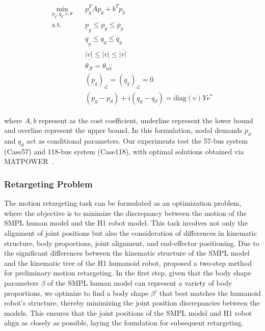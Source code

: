 \begin{align}  
\begin{aligned}
\min_{p_g, q_g, v, \theta} \quad & p_g^TAp_g + b^Tp_g\\  
\text{s.t.}  
\quad & \underline{p}_g \leq p_g \leq \overline{p}_g\\  
\quad & \underline{q}_g \leq q_g \leq \overline{q}_g\\  
\quad & \underline{|v|} \leq |v| \leq \overline{|v|}\\  
\quad & \theta_{\mathcal{R}} = \theta_{\text{ref}}\\  
\quad & (p_g)_{\mathcal{L}} = (q_g)_\mathcal{L} = 0\\  
\quad & (p_g - p_d) + i(q_g - q_d) = \text{diag}(v)Yv^*  
\end{aligned}
\end{align}  

where \(A,b\) represent as the cost coefficient, underline represent the lower bound and overline represent the upper bound. In this formulation, nodal demands \( p_d \) and \( q_d \) act as conditional parameters. Our experiments test the 57-bus system (Case57) and 118-bus system (Case118), with optimal solutions obtained via MATPOWER~\cite{5491276}.  

\subsubsection{Retargeting Problem}
\label{appendix:exper-retargetting}

The motion retargeting task can be formulated as an optimization problem, where the objective is to minimize the discrepancy between the motion of the SMPL human model and the H1 robot model. This task involves not only the alignment of joint positions but also the consideration of differences in kinematic structure, body proportions, joint alignment, and end-effector positioning.
Due to the significant differences between the kinematic structure of the SMPL model and the kinematic tree of the H1 humanoid robot, \cite{he2024learning} proposed a two-step method for preliminary motion retargeting. In the first step, given that the body shape parameters $\beta$ of the SMPL human model can represent a variety of body proportions, we optimize to find a body shape $\beta'$ that best matches the humanoid robot’s structure, thereby minimizing the joint position discrepancies between the models. This ensures that the joint positions of the SMPL model and H1 robot align as closely as possible, laying the foundation for subsequent retargeting.

